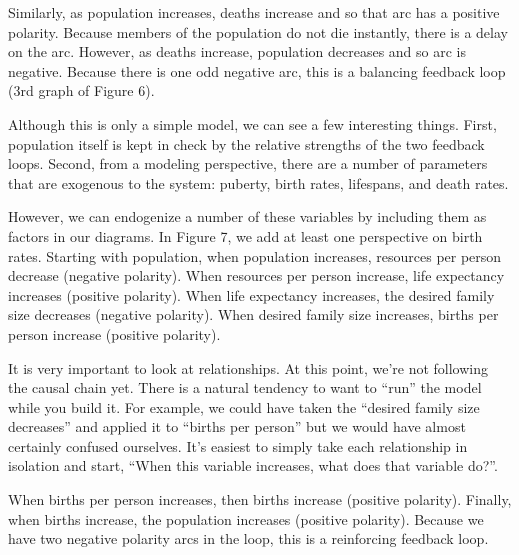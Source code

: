 \documentclass[letterpaper,10pt,english]{sphinxmanual}
\begin{document}
Similarly, as population increases, deaths increase and so that arc has a positive polarity. Because members of the population do not die instantly, there is a delay on the arc. However, as deaths increase, population decreases and so  arc is negative. Because there is one odd negative arc, this is a balancing feedback loop (3rd graph of Figure 6).


\begin{DUlineblock}{0em}
\item[] 
\end{DUlineblock}

Although this is only a simple model, we can see a few interesting things. First, population itself is kept in check by the relative strengths of the two feedback loops. Second, from a modeling perspective, there are a number of parameters that are exogenous to the system: puberty, birth rates, lifespans, and death rates.

However, we can endogenize a number of these variables by including them as factors in our diagrams. In Figure 7, we add at least one perspective on birth rates. Starting with population, when population increases, resources per person decrease (negative polarity). When resources per person increase, life expectancy increases (positive polarity). When life expectancy increases, the desired family size decreases (negative polarity). When desired family size increases, births per person increase
(positive polarity).

It is very important to look at  relationships. At this point, we’re not following the causal chain yet. There is a natural tendency to want to “run” the model while you build it. For example, we could have taken the “desired family size decreases” and applied it to “births per person” but we would have almost certainly confused ourselves. It’s easiest to simply take each relationship in isolation and start, “When this variable increases, what does that variable do?”.

When births per person increases, then births increase (positive polarity). Finally, when births increase, the population increases (positive polarity). Because we have two negative polarity arcs in the loop, this is a reinforcing feedback loop.

\end{document}
